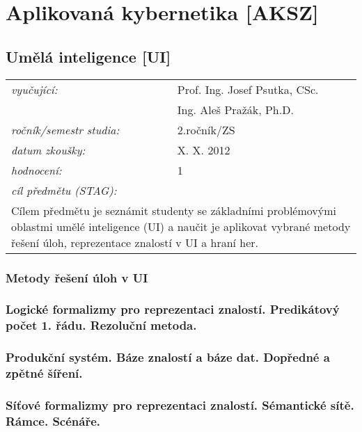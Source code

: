 \chapter{Aplikovaná kybernetika [AKSZ]}

\section{Umělá inteligence [UI]}

\begin{table}[H]
\centering
\begin{tabular}{p{4cm} p{12cm}}
\textit{vyučující:}             & Prof. Ing. Josef Psutka, CSc. \\
								 & Ing. Aleš Pražák, Ph.D. \\
\textit{ročník/semestr studia:} & 2.ročník/ZS \\
\textit{datum zkoušky:}         & X. X. 2012 \\
\textit{hodnocení:}             & 1 \\
\textit{cíl předmětu (STAG):}   & \\
\multicolumn{2}{p{16cm}}{Cílem předmětu je seznámit studenty se základními problémovými oblastmi umělé inteligence (UI) a naučit je aplikovat vybrané metody řešení úloh, reprezentace znalostí v UI a hraní her.}
\end{tabular}
\end{table}

\subsection{Metody řešení úloh v UI}

\newpage
\subsection{Logické formalizmy pro reprezentaci znalostí. Predikátový počet 1. řádu. Rezoluční metoda.}

\newpage
\subsection{Produkční systém. Báze znalostí a báze dat. Dopředné a zpětné šíření.}

\newpage
\subsection{Síťové formalizmy pro reprezentaci znalostí. Sémantické sítě. Rámce. Scénáře.}

